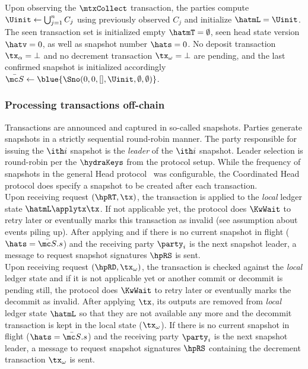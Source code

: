 \quad Upon observing the $\mtxCollect$
transaction, the parties compute $\Uinit \gets \bigcup_{j=1}^{n} C_j$ using
previously observed $C_j$ and initialize $\hatmL = \Uinit$. The seen transaction
set is initialized empty $\hatmT = \emptyset$, seen head state version
$\hatv = 0$, as well as snapshot number $\hats = 0$. No deposit transaction
$\tx_{\alpha} = \bot$ and no decrement transaction $\tx_{\omega} = \bot$ are
pending, and the last confirmed snapshot is initialized accordingly
$\bar{\mc S} \gets \blue{\Sno(0, 0, [], \Uinit, \emptyset, \emptyset)}$.

\subsubsection{Processing transactions off-chain}

Transactions are announced and captured in so-called snapshots. Parties generate
snapshots in a strictly sequential round-robin manner. The party responsible for
issuing the $\ith i$ snapshot is the \emph{leader} of the $\ith i$ snapshot.
Leader selection is round-robin per the $\hydraKeys$ from the protocol setup.
While the frequency of snapshots in the general Head protocol~\cite{hydrahead20}
was configurable, the Coordinated Head protocol does specify a snapshot to be
created after each transaction.\\

\quad Upon receiving request $(\hpRT,\tx)$, the transaction
is applied to the \emph{local} ledger state $\hatmL \applytx \tx$. If not
applicable yet, the protocol does $\KwWait$ to retry later or eventually marks
this transaction as invalid (see assumption about events piling up). After
applying and if there is no current snapshot in flight ($\hats = \bar{\mc S}.s$)
and the receiving party $\party_{i}$ is the next snapshot leader, a message to
request snapshot signatures $\hpRS$ is sent. \\

\quad Upon receiving request $(\hpRD,\tx_\omega)$, the
transaction is checked against the \emph{local} ledger state and if it is not
applicable yet or another commit or decommit is pending still, the protocol does
$\KwWait$ to retry later or eventually marks the decommit as invalid. After
applying $\tx$, its outputs are removed from \emph{local} ledger state $\hatmL$
so that they are not available any more and the decommit transaction is kept in
the local state ($\tx_\omega$). If there is no current snapshot in flight
($\hats = \bar{\mc S}.s$) and the receiving party $\party_{i}$ is the next
snapshot leader, a message to request snapshot signatures $\hpRS$ containing the
decrement transaction $\tx_\omega$ is sent. \\

